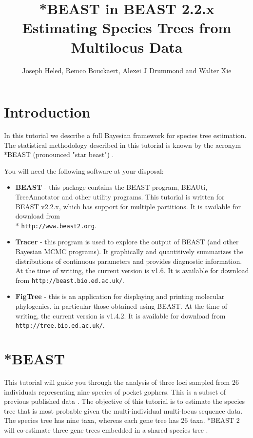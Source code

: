 \documentclass{article}
\newcommand{\BEASTVersion}{2.2.x}
\newcommand{\TracerVersion}{1.6}
\newcommand{\FigTreeVersion}{1.4.2}
\begin{document}
\title{*BEAST in BEAST {\BEASTVersion}\\
Estimating Species Trees from Multilocus Data}

\author{Joseph Heled, Remco Bouckaert, Alexei J Drummond and Walter Xie}

\maketitle

\section{Introduction}

In this tutorial we describe a full Bayesian framework for species tree estimation. The statistical methodology described in this tutorial is known by the acronym *BEAST (pronounced "star beast") \cite{Heled:2010fk}.

You will need the following software at your disposal:

\begin{itemize}

\item {\bf BEAST} - this package contains the BEAST program, BEAUti, TreeAnnotator and other utility programs. This tutorial is written for BEAST v{\BEASTVersion}, which has support for multiple partitions. It is available for download from \\* \texttt{http://www.beast2.org}.
\item {\bf Tracer} - this program is used to explore the output of BEAST (and other Bayesian MCMC programs). It graphically and
quantitively summarizes the distributions of continuous parameters and provides diagnostic information. At the time of
writing, the current version is v{\TracerVersion}. It is available for download from \texttt{http://beast.bio.ed.ac.uk/}.
\item {\bf FigTree} - this is an application for displaying and printing molecular phylogenies, in particular those obtained using
BEAST. At the time of writing, the current version is v{\FigTreeVersion}. It is available for download from \texttt{http://tree.bio.ed.ac.uk/}.
\end{itemize}

\section{*BEAST}

This tutorial will guide you through the analysis of three loci sampled from 26 individuals representing nine species of pocket gophers. This is a subset of previous published data \cite{belfiore2008multilocus}. The objective of this tutorial is to estimate the species tree that is most probable given the multi-individual multi-locus sequence data. The species tree has nine taxa, whereas each gene tree has 26 taxa. *BEAST 2 will co-estimate three gene trees embedded in a shared species tree \cite[for details]{Heled:2010fk}.
\end{document}
